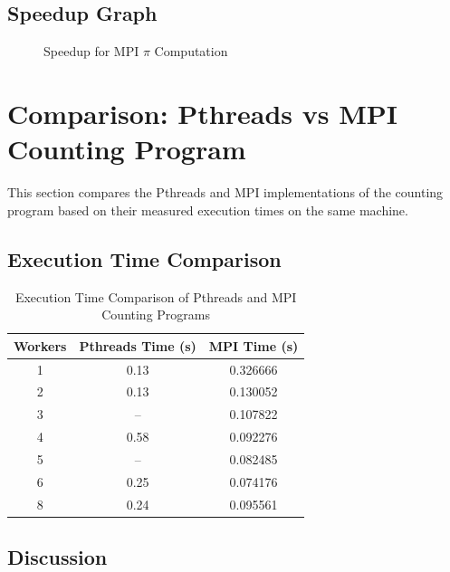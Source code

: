 \documentclass[12pt,a4paper]{article}
\begin{document}
\subsection{Speedup Graph}

\begin{figure}[H]
\centering
{}
\caption{Speedup for MPI $\pi$ Computation}
\end{figure}

\section{Comparison: Pthreads vs MPI Counting Program}

This section compares the Pthreads and MPI implementations of the counting
program based on their measured execution times on the same machine.

\subsection{Execution Time Comparison}

\begin{table}[H]
\centering
\begin{tabular}{c c c}
\toprule
\textbf{Workers} & \textbf{Pthreads Time (s)} & \textbf{MPI Time (s)} \\
\midrule
1 & 0.13 & 0.326666 \\
2 & 0.13 & 0.130052 \\
3 & --   & 0.107822 \\
4 & 0.58 & 0.092276 \\
5 & --   & 0.082485 \\
6 & 0.25 & 0.074176 \\
8 & 0.24 & 0.095561 \\
\bottomrule
\end{tabular}
\caption{Execution Time Comparison of Pthreads and MPI Counting Programs}
\end{table}

\subsection{Discussion}
\end{document}
